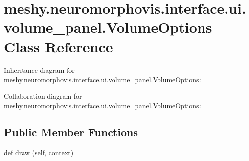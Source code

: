 \hypertarget{classmeshy_1_1neuromorphovis_1_1interface_1_1ui_1_1volume__panel_1_1VolumeOptions}{}\section{meshy.\+neuromorphovis.\+interface.\+ui.\+volume\+\_\+panel.\+Volume\+Options Class Reference}
\label{classmeshy_1_1neuromorphovis_1_1interface_1_1ui_1_1volume__panel_1_1VolumeOptions}


 




Inheritance diagram for meshy.\+neuromorphovis.\+interface.\+ui.\+volume\+\_\+panel.\+Volume\+Options\+:


Collaboration diagram for meshy.\+neuromorphovis.\+interface.\+ui.\+volume\+\_\+panel.\+Volume\+Options\+:
\subsection*{Public Member Functions}
\begin{DoxyCompactItemize}
\item 
def \hyperlink{classmeshy_1_1neuromorphovis_1_1interface_1_1ui_1_1volume__panel_1_1VolumeOptions_aa6466bad68be7d10c832f73f3e8998bb}{draw} (self, context)
\end{DoxyCompactItemize}
